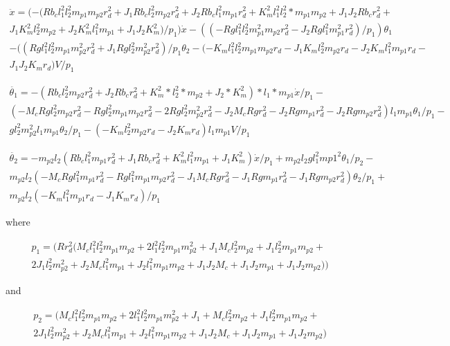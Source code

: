 \documentclass{article}
\begin{document}
\begin{multline} 
\label{eqn6th4}
\ddot{x} = (-(R b_c l_1^2 l_2^2 m_{p1} m_{p2} r_d^2+J_1 R b_c l_2^2 m_{p2} r_d^2+J_2 R b_c l_1^2 m_{p1} r_d^2+K_m^2 l_1^2 l_2^2*m_{p1} m_{p2}+J_1 J_2 R b_c r_d^2+\\J_1 K_m^2 l_2^2 m_{p2}+J_2 K_m^2 l_1^2 m_{p1}+J_1 J_2 K_m^2)/p_1)\dot{x} -((-R g l_1^2 l_2^2 m_{p1}^2 m_{p2} r_d^2-J_2 R g l_1^2 m_{p1}^2 r_d^2)/p_1)\theta_1 \\-((R g l_1^2 l_2^2 m_{p1} m_{p2}^2 r_d^2+J_1 R g l_2^2 m_{p2}^2 r_d^2)/p_1 \theta_2 -(-K_m l_1^2 l_2^2 m_{p1} m_{p2} r_d-J_1 K_m l_2^2 m_{p2} r_d-J_2 K_m l_1^2 m_{p1} r_d-\\J_1 J_2 K_m r_d) V/p_1
\end{multline}

\begin{multline} 
\label{eqn6th5}
\ddot{\theta_1} = -(R b_c l_2^2 m_{p2} r_d^2+J_2 R b_c r_d^2+K_m^2*l_2^2*m_{p2}+J_2*K_m^2)*l_1*m_{p1} \dot{x}/p_1 -\\(-M_c R g l_2^2 m_{p2} r_d^2-R g l_2^2 m_{p1} m_{p2} r_d^2-2 R g l_2^2 m_{p2}^2 r_d^2-J_2 M_c R g r_d^2-J_2 R g m_{p1} r_d^2-J_2 R g m_{p2} r_d^2) l_1 m_{p1} \theta_1 /p_1-\\g l_2^2 m_{p2}^2 l_1 m_{p1} \theta_2/p_1-(-K_m l_2^2 m_{p2} r_d-J_2 K_m r_d) l_1 m_{p1} V/p_1
\end{multline}

\begin{multline} 
\label{eqn6th6}
\ddot{\theta_2} = -m_{p2} l_2 (R b_c l_1^2 m_{p1} r_d^2+J_1 R b_c r_d^2+K_m^2 l_1^2 m_{p1}+J_1 K_m^2)\dot{x}/p_1 +m_{p2} l_2 g l_1^2 m{p1}^2 \theta_1/p_2 - \\m_{p2} l_2 (-M_c R g l_1^2 m_{p1} r_d^2-R g l_1^2 m_{p1} m_{p2} r_d^2-J_1 M_c R g r_d^2-J_1 R g m_{p1} r_d^2-J_1 R g m_{p2} r_d^2) \theta_2/p_1 + \\m_{p2} l_2 (-K_m l_1^2 m_{p1} r_d-J_1 K_m r_d)/p_1
\end{multline}

where 

\begin{multline} 
\label{p1}
p_1 = (R r_d^2 (M_c l_1^2 l_2^2 m_{p1} m_{p2}+2 l_1^2 l_2^2 m_{p1} m_{p2}^2+J_1 M_c l_2^2 m_{p2}+J_1 l_2^2 m_{p1} m_{p2}+\\2 J_1 l_2^2 m_{p2}^2+J_2 M_c l_1^2 m_{p1}+J_2 l_1^2 m_{p1} m_{p2}+J_1 J_2 M_c+J_1 J_2 m_{p1}+J_1 J_2 m_{p2}))
\end{multline}

and 

\begin{multline*} 
\label{p2}
 p_2 = (M_c l_1^2 l_2^2 m_{p1}m_{p2}+2 l_1^2 l_2^2 m_{p1} m_{p2}^2+J_1+M_c l_2^2 m_{p2}+J_1 l_2^2 m_{p1} m_{p2}+\\2 J_1 l_2^2 m_{p2}^2+J_2 M_c l_1^2 m_{p1}+J_2 l_1^2 m_{p1} m_{p2}+J_1 J_2 M_c+J_1 J_2 m_{p1}+J_1 J_2 m_{p2})
\end{multline*}
\end{document}
